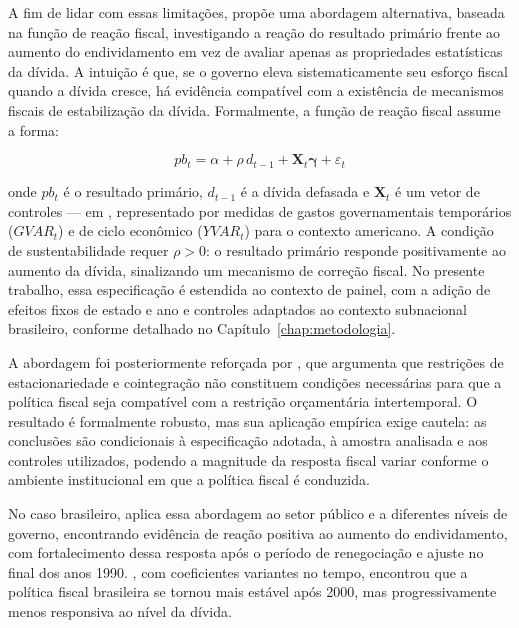 A fim de lidar com essas limitações,  propõe uma abordagem alternativa, baseada na função de reação fiscal, investigando a reação do resultado primário frente ao aumento do endividamento em vez de avaliar apenas as propriedades estatísticas da dívida. A intuição é que, se o governo eleva sistematicamente seu esforço fiscal quando a dívida cresce, há evidência compatível com a existência de mecanismos fiscais de estabilização da dívida. Formalmente, a função de reação fiscal assume a forma:

\begin{equation}
pb_{t} = \alpha + \rho \, d_{t-1} + \mathbf{X}_t\boldsymbol{\gamma} + \varepsilon_t
\label{eq:bohn}
\end{equation}

\noindent onde $pb_{t}$ é o resultado primário, $d_{t-1}$ é a dívida defasada e $\mathbf{X}_t$ é um vetor de controles — em , representado por medidas de gastos governamentais temporários ($GVAR_t$) e de ciclo econômico ($YVAR_t$) para o contexto americano. A condição de sustentabilidade requer $\rho > 0$: o resultado primário responde positivamente ao aumento da dívida, sinalizando um mecanismo de correção fiscal. No presente trabalho, essa especificação é estendida ao contexto de painel, com a adição de efeitos fixos de estado e ano e controles adaptados ao contexto subnacional brasileiro, conforme detalhado no Capítulo~\ref{chap:metodologia}.

A abordagem foi posteriormente reforçada por , que argumenta que restrições de estacionariedade e cointegração não constituem condições necessárias para que a política fiscal seja compatível com a restrição orçamentária intertemporal. O resultado é formalmente robusto, mas sua aplicação empírica exige cautela: as conclusões são condicionais à especificação adotada, à amostra analisada e aos controles utilizados, podendo a magnitude da resposta fiscal variar conforme o ambiente institucional em que a política fiscal é conduzida.

No caso brasileiro,  aplica essa abordagem ao setor público e a diferentes níveis de governo, encontrando evidência de reação positiva ao aumento do endividamento, com fortalecimento dessa resposta após o período de renegociação e ajuste no final dos anos 1990. , com coeficientes variantes no tempo, encontrou que a política fiscal brasileira se tornou mais estável após 2000, mas progressivamente menos responsiva ao nível da dívida. 

